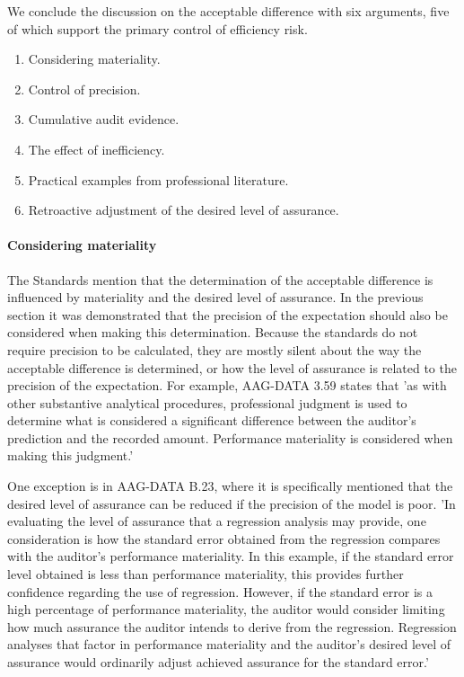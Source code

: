 \bigskip
We conclude the discussion on the acceptable difference with six arguments, five of which support the primary control of efficiency risk.

\begin{enumerate}
	\item Considering materiality.
	\item Control of precision.
	\item Cumulative audit evidence.
	\item The effect of inefficiency.
	\item Practical examples from professional literature.
	\item Retroactive adjustment of the desired level of assurance.
\end{enumerate}

\paragraph{Considering materiality} The Standards mention that the determination of the acceptable difference is influenced by materiality and the desired level of assurance. In the previous section it was demonstrated that the precision of the expectation should also be considered when making this determination. Because the standards do not require precision to be calculated, they are mostly silent about the way the acceptable difference is determined, or how the level of assurance is related to the precision of the expectation. For example, AAG-DATA 3.59 states that 'as with other substantive analytical procedures, professional judgment is used to determine what is considered a significant difference between the auditor's prediction and the recorded amount. Performance materiality is considered when making this judgment.' 

One exception is in AAG-DATA B.23, where it is specifically mentioned that the desired level of assurance can be reduced if the precision of the model is poor. 'In evaluating the level of assurance that a regression analysis may provide, one consideration is how the standard error obtained from the regression compares with the auditor's performance materiality. In this example, if the standard error level obtained is less than performance materiality, this provides further confidence regarding the use of regression. However, if the standard error is a high percentage of performance materiality, the auditor would consider limiting how much assurance the auditor intends to derive from the regression. Regression analyses that factor in performance materiality and the auditor's desired level of assurance would ordinarily adjust achieved assurance for the standard error.'

